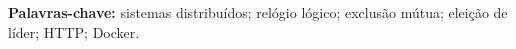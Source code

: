 \documentclass[12pt,a4paper,oneside]{article}
\begin{document}
\noindent\textbf{Palavras-chave:} sistemas distribuídos; relógio lógico; exclusão mútua; eleição de líder; HTTP; Docker.

\tableofcontents
\listoffigures
\listoftables
\clearpage
{}










\end{document}
